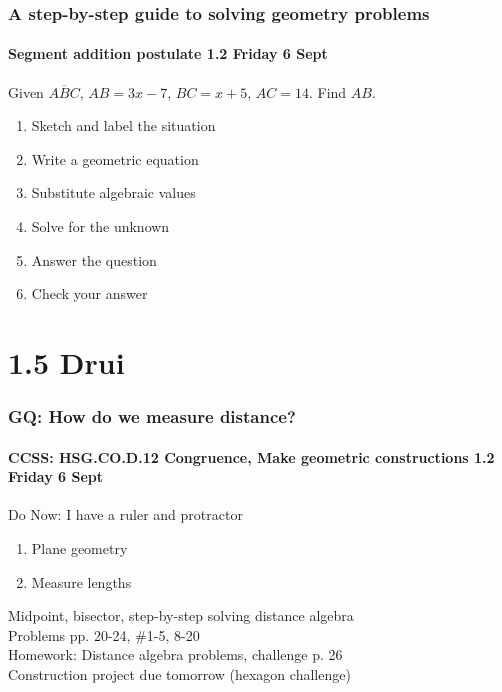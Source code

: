 \documentclass{beamer}
\begin{document}
\frame
{
  \frametitle{A step-by-step guide to solving geometry problems}
  \framesubtitle{Segment addition postulate \hfill \alert{1.2 Friday 6 Sept}}
  Given $\overline{ABC}$, $AB=3x-7$, $BC=x+5$, $AC=14$. Find ${AB}$.\\[0.5in]
      \vspace{1cm}
\begin{enumerate}
    \item<2-> Sketch and label the situation\\
    \item<2-> Write a geometric equation\\
    \item<2-> Substitute algebraic values\\
    \item<2-> Solve for the unknown\\
    \item<2-> Answer the question\\
    \item<2-> Check your answer
  \end{enumerate}
}


\section{1.5 Drui}
  \frame
  {
    \frametitle{GQ: How do we measure distance?}
    \framesubtitle{CCSS: HSG.CO.D.12 Congruence, Make geometric constructions \hfill \alert{1.2 Friday 6 Sept}}

    \begin{block}{Do Now: I have a ruler and protractor}
    \begin{enumerate}
        \item Plane geometry
        \item Measure lengths
    \end{enumerate}
    \end{block}
    Midpoint, bisector, step-by-step solving distance algebra\\
    Problems pp. 20-24, \#1-5, 8-20\\
    \vspace{0.5cm}
    Homework: Distance algebra problems, challenge p. 26\\
    Construction project due tomorrow (hexagon challenge)
  }
\end{document}
